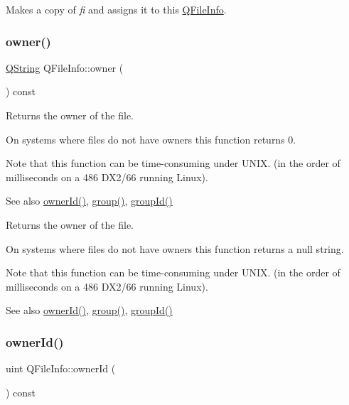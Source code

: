 Makes a copy of {\itshape fi} and assigns it to this \mbox{\hyperlink{class_q_file_info}{Q\+File\+Info}}. \mbox{\label{class_q_file_info_a96831b45809e905dc14e5c065bfa8421}} 
\subsubsection{\texorpdfstring{owner()}{owner()}}
{\footnotesize\ttfamily \mbox{\hyperlink{class_q_string}{Q\+String}} Q\+File\+Info\+::owner (\begin{DoxyParamCaption}{ }\end{DoxyParamCaption}) const}

Returns the owner of the file.

On systems where files do not have owners this function returns 0.

Note that this function can be time-\/consuming under U\+N\+IX. (in the order of milliseconds on a 486 D\+X2/66 running Linux).

\begin{DoxySeeAlso}{See also}
\mbox{\hyperlink{class_q_file_info_ab963b7409fa73f7cc31aaff794015c4f}{owner\+Id()}}, \mbox{\hyperlink{class_q_file_info_afb46f8fb3080ab0b32b4236436624ea3}{group()}}, \mbox{\hyperlink{class_q_file_info_a40e9808fbf54b07717d2f3a4307da74f}{group\+Id()}}
\end{DoxySeeAlso}
Returns the owner of the file.

On systems where files do not have owners this function returns a null string.

Note that this function can be time-\/consuming under U\+N\+IX. (in the order of milliseconds on a 486 D\+X2/66 running Linux).

\begin{DoxySeeAlso}{See also}
\mbox{\hyperlink{class_q_file_info_ab963b7409fa73f7cc31aaff794015c4f}{owner\+Id()}}, \mbox{\hyperlink{class_q_file_info_afb46f8fb3080ab0b32b4236436624ea3}{group()}}, \mbox{\hyperlink{class_q_file_info_a40e9808fbf54b07717d2f3a4307da74f}{group\+Id()}} 
\end{DoxySeeAlso}
\mbox{\label{class_q_file_info_ab963b7409fa73f7cc31aaff794015c4f}} 
\subsubsection{\texorpdfstring{ownerId()}{ownerId()}}
{\footnotesize\ttfamily uint Q\+File\+Info\+::owner\+Id (\begin{DoxyParamCaption}{ }\end{DoxyParamCaption}) const}

